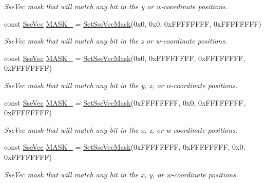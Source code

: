 \begin{DoxyCompactItemize}
\begin{DoxyCompactList}\small\item\em Sse\+Vec mask that will match any bit in the y or w-\/coordinate positions. \end{DoxyCompactList}\item 
const \hyperlink{namespacegfxmath_a0de2243e2b8d0fd46d3af5e036423004}{Sse\+Vec} \hyperlink{namespacegfxmath_ab0a1cad00f30a2a2967afd4076b70d14}{M\+A\+S\+K\+\_} = \hyperlink{namespacegfxmath_ae6fdce7b817a9d0caea6a71c5a377bbb}{Set\+Sse\+Vec\+Mask}(0x0, 0x0, 0x\+F\+F\+F\+F\+F\+F\+F\+F, 0x\+F\+F\+F\+F\+F\+F\+F\+F)
\begin{DoxyCompactList}\small\item\em Sse\+Vec mask that will match any bit in the z or w-\/coordinate positions. \end{DoxyCompactList}\item 
const \hyperlink{namespacegfxmath_a0de2243e2b8d0fd46d3af5e036423004}{Sse\+Vec} \hyperlink{namespacegfxmath_af0b3d0d404066d8571a0a5b3ac58c76d}{M\+A\+S\+K\+\_} = \hyperlink{namespacegfxmath_ae6fdce7b817a9d0caea6a71c5a377bbb}{Set\+Sse\+Vec\+Mask}(0x0, 0x\+F\+F\+F\+F\+F\+F\+F\+F, 0x\+F\+F\+F\+F\+F\+F\+F\+F, 0x\+F\+F\+F\+F\+F\+F\+F\+F)
\begin{DoxyCompactList}\small\item\em Sse\+Vec mask that will match any bit in the y, z, or w-\/coordinate positions. \end{DoxyCompactList}\item 
const \hyperlink{namespacegfxmath_a0de2243e2b8d0fd46d3af5e036423004}{Sse\+Vec} \hyperlink{namespacegfxmath_aacb5eed4ebafce721c4db8d6358854f6}{M\+A\+S\+K\+\_} = \hyperlink{namespacegfxmath_ae6fdce7b817a9d0caea6a71c5a377bbb}{Set\+Sse\+Vec\+Mask}(0x\+F\+F\+F\+F\+F\+F\+F\+F, 0x0, 0x\+F\+F\+F\+F\+F\+F\+F\+F, 0x\+F\+F\+F\+F\+F\+F\+F\+F)
\begin{DoxyCompactList}\small\item\em Sse\+Vec mask that will match any bit in the x, z, or w-\/coordinate positions. \end{DoxyCompactList}\item 
const \hyperlink{namespacegfxmath_a0de2243e2b8d0fd46d3af5e036423004}{Sse\+Vec} \hyperlink{namespacegfxmath_a4116006bc68366e5d806a971fe6a3706}{M\+A\+S\+K\+\_} = \hyperlink{namespacegfxmath_ae6fdce7b817a9d0caea6a71c5a377bbb}{Set\+Sse\+Vec\+Mask}(0x\+F\+F\+F\+F\+F\+F\+F\+F, 0x\+F\+F\+F\+F\+F\+F\+F\+F, 0x0, 0x\+F\+F\+F\+F\+F\+F\+F\+F)
\begin{DoxyCompactList}\small\item\em Sse\+Vec mask that will match any bit in the x, y, or w-\/coordinate positions. \end{DoxyCompactList}\item 

\end{DoxyCompactItemize}

